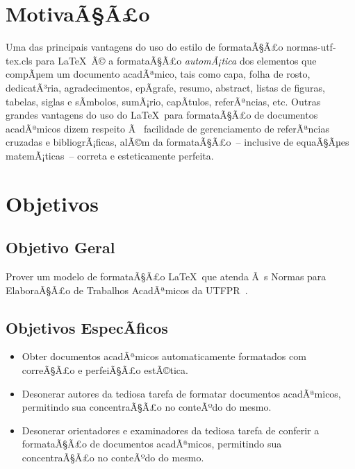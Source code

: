 \documentclass[openright]{normas-utf-tex} %
\begin{document}
\section{MotivaÃ§Ã£o}
\label{sec:motivacao}

Uma das principais vantagens do uso do estilo de formataÃ§Ã£o {\ttfamily normas-utf-tex.cls} para \LaTeX\ Ã© a formataÃ§Ã£o \textit{automÃ¡tica} dos elementos que compÃµem um documento acadÃªmico, tais como capa, folha de rosto, dedicatÃ³ria, agradecimentos, epÃ­grafe, resumo, abstract, listas de figuras, tabelas, siglas e sÃ­mbolos, sumÃ¡rio, capÃ­tulos, referÃªncias, etc. Outras grandes vantagens do uso do \LaTeX\ para formataÃ§Ã£o de documentos acadÃªmicos dizem respeito Ã  facilidade de gerenciamento de referÃªncias cruzadas e bibliogrÃ¡ficas, alÃ©m da formataÃ§Ã£o~-- inclusive de equaÃ§Ãµes  matemÃ¡ticas~-- correta e esteticamente perfeita.

\section{Objetivos}
\label{sec:objetivos}

\subsection{Objetivo Geral}
\label{subsec:objetivoGeral}

Prover um modelo de formataÃ§Ã£o \LaTeX\ que atenda Ã s Normas para ElaboraÃ§Ã£o de Trabalhos AcadÃªmicos da UTFPR~\cite{UTFPR2008}.

\subsection{Objetivos EspecÃ­ficos}
\label{subsec:objetivosEspecificos}

\begin{itemize}
	\item Obter documentos acadÃªmicos automaticamente formatados com correÃ§Ã£o e perfeiÃ§Ã£o estÃ©tica.
	\item Desonerar autores da tediosa tarefa de formatar documentos acadÃªmicos, permitindo sua concentraÃ§Ã£o no conteÃºdo do mesmo.
	\item Desonerar orientadores e examinadores da tediosa tarefa de conferir a formataÃ§Ã£o de documentos acadÃªmicos, permitindo sua concentraÃ§Ã£o no conteÃºdo do mesmo.
\end{itemize}
\end{document}
